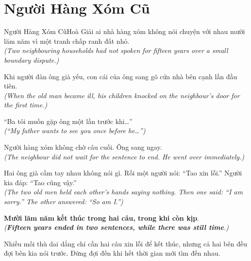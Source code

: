\section{Người Hàng Xóm Cũ}
\begin{truyen}{Người Hàng Xóm Cũ}{Hoà Giải}
ai nhà hàng xóm không nói chuyện với nhau mười lăm năm vì một tranh chấp ranh đất nhỏ.\\
\textit{(Two neighbouring households had not spoken for fifteen years over a small boundary dispute.)}

Khi người đàn ông già yếu, con cái của ông sang gõ cửa nhà bên cạnh lần đầu tiên.\\
\textit{(When the old man became ill, his children knocked on the neighbour's door for the first time.)}

``Ba tôi muốn gặp ông một lần trước khi\dots''\\
\textit{(``My father wants to see you once before he\dots'')}

Người hàng xóm không chờ câu cuối. Ông sang ngay.\\
\textit{(The neighbour did not wait for the sentence to end. He went over immediately.)}

Hai ông già cầm tay nhau không nói gì. Rồi một người nói: ``Tao xin lỗi.'' Người kia đáp: ``Tao cũng vậy.''\\
\textit{(The two old men held each other's hands saying nothing. Then one said: ``I am sorry.'' The other answered: ``So am I.'')}

\textbf{Mười lăm năm kết thúc trong hai câu, trong khi còn kịp}.\\
\textit{(\textbf{Fifteen years ended in two sentences, while there was still time}.)}
\end{truyen}
\begin{baihoc}
  Nhiều mối thù dai dẳng chỉ cần hai câu xin lỗi để kết thúc, nhưng cả hai bên đều đợi bên kia nói trước. Đừng đợi đến khi hết thời gian mới tìm đến nhau.
\end{baihoc}

